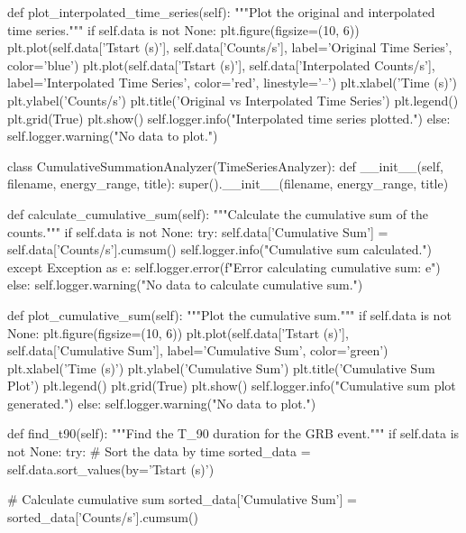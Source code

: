 \documentclass[nofootinbib,aps]{revtex4}
\begin{document}
\begin{framed}
\begin{pythoncode}[caption={main.py code}]
    def plot_interpolated_time_series(self):
        """Plot the original and interpolated time series."""
        if self.data is not None:
            plt.figure(figsize=(10, 6))
            plt.plot(self.data['Tstart (s)'], self.data['Counts/s'], label='Original Time Series', color='blue')
            plt.plot(self.data['Tstart (s)'], self.data['Interpolated Counts/s'], label='Interpolated Time Series', color='red', linestyle='--')
            plt.xlabel('Time (s)')
            plt.ylabel('Counts/s')
            plt.title('Original vs Interpolated Time Series')
            plt.legend()
            plt.grid(True)
            plt.show()
            self.logger.info("Interpolated time series plotted.")
        else:
            self.logger.warning("No data to plot.")

class CumulativeSummationAnalyzer(TimeSeriesAnalyzer):
    def __init__(self, filename, energy_range, title):
        super().__init__(filename, energy_range, title)

    def calculate_cumulative_sum(self):
        """Calculate the cumulative sum of the counts."""
        if self.data is not None:
            try:
                self.data['Cumulative Sum'] = self.data['Counts/s'].cumsum()
                self.logger.info("Cumulative sum calculated.")
            except Exception as e:
                self.logger.error(f"Error calculating cumulative sum: {e}")
        else:
            self.logger.warning("No data to calculate cumulative sum.")

    def plot_cumulative_sum(self):
        """Plot the cumulative sum."""
        if self.data is not None:
            plt.figure(figsize=(10, 6))
            plt.plot(self.data['Tstart (s)'], self.data['Cumulative Sum'], label='Cumulative Sum', color='green')
            plt.xlabel('Time (s)')
            plt.ylabel('Cumulative Sum')
            plt.title('Cumulative Sum Plot')
            plt.legend()
            plt.grid(True)
            plt.show()
            self.logger.info("Cumulative sum plot generated.")
        else:
            self.logger.warning("No data to plot.")

    def find_t90(self):
        """Find the T_90 duration for the GRB event."""
        if self.data is not None:
            try:
                # Sort the data by time
                sorted_data = self.data.sort_values(by='Tstart (s)')
                
                # Calculate cumulative sum
                sorted_data['Cumulative Sum'] = sorted_data['Counts/s'].cumsum()
                

\end{pythoncode}
\end{framed}
\end{document}

